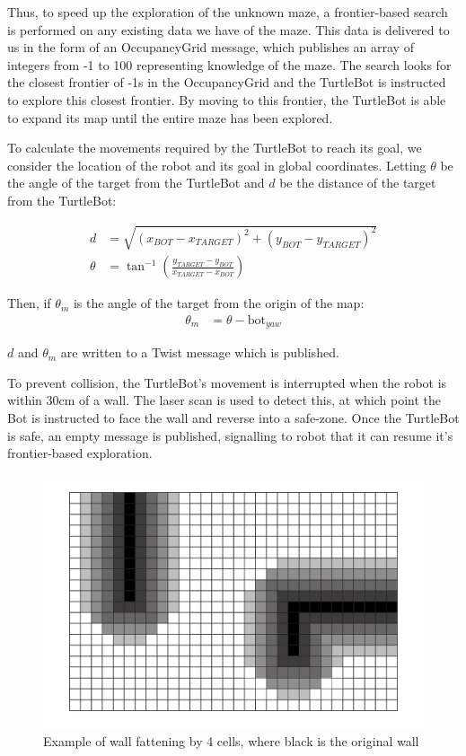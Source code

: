 \documentclass[titlepage,12pt,a4paper]{article}
\begin{document}
Thus, to speed up the exploration of the unknown maze, a frontier-based search is performed on any existing data we have of the maze. This data is delivered to us in the form of an OccupancyGrid message, which publishes an array of integers from -1 to 100 representing knowledge of the maze. The search looks for the closest frontier of -1s in the OccupancyGrid and the TurtleBot is instructed to explore this closest frontier. By moving to this frontier, the TurtleBot is able to expand its map until the entire maze has been explored. 

To calculate the movements required by the TurtleBot to reach its goal, we consider the location of the robot and its goal in global coordinates. Letting $\theta$ be the angle of the target from the TurtleBot and $d$ be the distance of the target from the TurtleBot:

\begin{align*}
	d			&=	\sqrt{(x_{BOT} - x_{TARGET})^2 + (y_{BOT} - y_{TARGET})^2} \\
	\theta		&=	\tan^{-1}{(\frac{y_{TARGET} - y_{BOT}}{x_{TARGET} - x_{BOT}})} 
\end{align*}

Then, if $\theta_m$ is the angle of the target from the origin of the map:
\begin{align*}
		\theta_m 	&=	\theta - \text{bot}_{yaw} 
\end{align*}

$d$ and $\theta_m$ are written to a Twist message which is published.

To prevent collision, the TurtleBot's movement is interrupted when the robot is within 30cm of a wall. The laser scan is used to detect this, at which point the Bot is instructed to face the wall and reverse into a safe-zone. Once the TurtleBot is safe, an empty message is published, signalling to robot that it can resume it's frontier-based exploration. \\

\begin{figure}[h]
	\begin{center}
	\includegraphics[scale=0.25]{wallfatten.jpg}
	\caption{Example of wall fattening by 4 cells, where black is the original wall}
	\end{center}
\end{figure}
\end{document}
